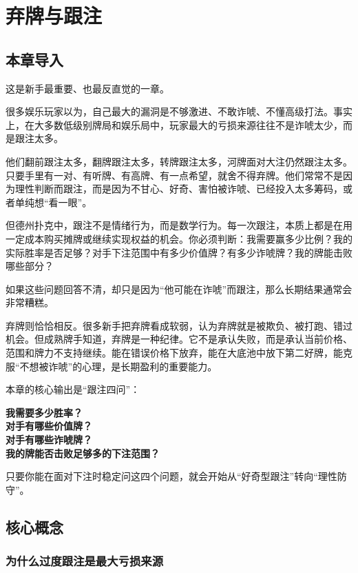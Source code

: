 \chapter{弃牌与跟注}

\section{本章导入}

这是新手最重要、也最反直觉的一章。

很多娱乐玩家以为，自己最大的漏洞是不够激进、不敢诈唬、不懂高级打法。事实上，在大多数低级别牌局和娱乐局中，玩家最大的亏损来源往往不是诈唬太少，而是跟注太多。

他们翻前跟注太多，翻牌跟注太多，转牌跟注太多，河牌面对大注仍然跟注太多。只要手里有一对、有听牌、有高牌、有一点希望，就舍不得弃牌。他们常常不是因为理性判断而跟注，而是因为不甘心、好奇、害怕被诈唬、已经投入太多筹码，或者单纯想“看一眼”。

但德州扑克中，跟注不是情绪行为，而是数学行为。每一次跟注，本质上都是在用一定成本购买摊牌或继续实现权益的机会。你必须判断：我需要赢多少比例？我的实际胜率是否足够？对手下注范围中有多少价值牌？有多少诈唬牌？我的牌能击败哪些部分？

如果这些问题回答不清，却只是因为“他可能在诈唬”而跟注，那么长期结果通常会非常糟糕。

弃牌则恰恰相反。很多新手把弃牌看成软弱，认为弃牌就是被欺负、被打跑、错过机会。但成熟牌手知道，弃牌是一种纪律。它不是承认失败，而是承认当前价格、范围和牌力不支持继续。能在错误价格下放弃，能在大底池中放下第二好牌，能克服“不想被诈唬”的心理，是长期盈利的重要能力。

本章的核心输出是“跟注四问”：

\begin{center}
\textbf{我需要多少胜率？\\
对手有哪些价值牌？\\
对手有哪些诈唬牌？\\
我的牌能否击败足够多的下注范围？}
\end{center}

只要你能在面对下注时稳定问这四个问题，就会开始从“好奇型跟注”转向“理性防守”。

\section{核心概念}

\subsection{为什么过度跟注是最大亏损来源}

